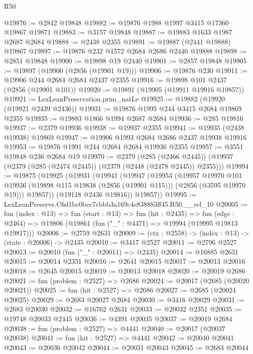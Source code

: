 \begin{lexlean}{R50}
\begin{coremodule}
@19876 := @2842 @19848
@19882 := @19876 @1988 @1997 @3415 @17360 @19867 @19871
@19883 := @3157 @19848
@19887 := @19883 @1633 @1987 @2687 @2684
@19888 := @2438 @2355
@19891 := @19887 (@2441 @19888) @19867
@19897 := @19876 @232 @1572 @2684 @2686 @2440 @19888
@19898 := @2851 @19848
@19900 := @19898 @19 @2440
@19901 := @2857 @19848
@19905 := @19897 (@19900 (@2856 (@19901 @19)))
@19906 := @19876 @230
@19911 := @19906 @244 @2684 @2684 @2437 @2355
@19916 := @19898 @101 @2437 (@2856 (@19901 @101))
@19920 := @19891 (@19905 (@19911 @19916 @19857))
@19921 := LexLeanPreservation.prim_natLe
@19925 := @19882 (@19920 (@19921 @2439 @2436))
@19931 := @19876 @1995 @244 @3415 @2684 @19869 @2355
@19935 := @19883 @1866 @1994 @2687 @2684
@19936 := @285 @19816
@19937 := @2379 @19936
@19938 := @19937 @2355
@19941 := @19935 (@2438 @19938) @19869
@19947 := @19906 @1993 @2684 @2686 @2437 @19938 @19916
@19953 := @19876 @1991 @244 @2684 @2684 @19936 @2355
@19957 := @3551 @19848 @236 @2684 @19
@19970 := @2379
    (@285 (@2466 @2445))
    (@19937 (@2379 (@285 (@2474 @2445)) (@2379 (@2448 (@2478 @2445)) @2355)))
@19994 := @19875
    (@19925
      (@19931
        (@19941
          (@19947
            (@19953
              (@19957
                @19970
                @101
                @19936
                (@19898 @115 @19838 (@2856 (@19901 @115)))
                (@2856 (@3595 @19970 @19)))
              @19857))
          (@19118 @2436 @19816))
        @19857))
@19995 := LexLeanPreserve.C6d1bc0bcc7cbbb3a169c4e838883ff45.R50.__rel_10
@20005 := fun (index : @13) =>
  fun (start : @13) =>
  fun (hit : @2435) =>
  fun (edge : @2464) => @19806 (@19861 (fun ("_" : @4471) => @19994 (@19995 @19813 @19817)))
@20006 := @2759 @2631
@20009 := (ctx : @2558) -> (index : @13) -> (state : @20006) -> @2435
@20010 := @3417 @2527
@20011 := @2796 @2527
@20013 := @20010 (fun ("_" : @20011) => @2435)
@20014 := @16885 @2631
@20015 := @20014 @2351
@20016 := @2641 @20015
@20017 := @20013 @20016
@20018 := @2645 @20015
@20019 := @20013 @20018
@20020 := @20019 @2686
@20021 := fun (problem : @2527) => @2686
@20024 := @20017 (@2685 (@20020 @20021))
@20025 := fun (hit : @2527) => @2686
@20027 := @2685 (@20024 @20025)
@20029 := @2683 @20027 @2684
@20030 := @3416 @20029
@20031 := @2683 @20030
@20032 := @16762 @2631
@20033 := @20032 @2351
@20035 := @19748 @20033 @2445
@20036 := @4391 @20035
@20037 := @20019 @2684
@20038 := fun (problem : @2527) => @4441
@20040 := @20017 (@20037 @20038)
@20041 := fun (hit : @2527) => @4441
@20042 := @20040 @20041
@20043 := @20036 @20042
@20044 := @20031 @20043
@20045 := @2683 @20044

\end{coremodule}
\end{lexlean}
